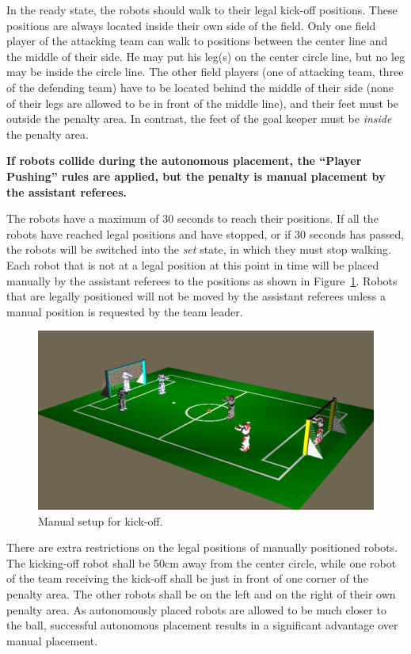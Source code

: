 \documentclass[12pt]{article}
\begin{document}
In the ready state, the robots should walk
to their legal kick-off positions. These positions are always
located inside their own side of the field. Only one field player
of the attacking team can walk to positions between the center line
and the middle of their side. He may put his leg(s) on the
center circle line, but no leg may be inside the circle line. The
other field players (one of attacking team, three of the defending team)
have to be located behind the middle of their side (none of their
legs are allowed to be in front of the middle line), and their feet must be outside the penalty area.
In contrast, the feet of the goal keeper must be \emph{inside}
the penalty area.

\textbf{If robots collide during the autonomous placement, the ``Player Pushing'' rules are applied, but
the penalty is manual placement by the assistant referees.}

The robots have a maximum of 30 seconds to reach their positions.
If all the robots have reached legal positions and have stopped, or
if 30 seconds has passed, the robots will be switched into the
\emph{set} state, in which they
must stop walking. Each robot that is not at a legal position at
this point in time will be placed manually by the assistant referees
to the positions as shown in Figure~\ref{fig:ko}. Robots
that are legally positioned will not be moved by the assistant
referees unless a manual position is requested by the team leader.

\begin{figure}[t]
\centerline{\includegraphics[width=\columnwidth]{figs/Kickoff3vs3}}
\caption{Manual setup for kick-off.}
\label{fig:ko}
\end{figure}

There are extra restrictions on the legal positions of manually
positioned robots. The kicking-off robot shall be 50cm
away from the center circle, while one robot of the team receiving the kick-off shall
be just in front of one corner of the penalty area. The other robots
shall be on the left and on the right of their own penalty area. As
autonomously placed robots are allowed to be much closer to the
ball, successful autonomous placement results in a significant
advantage over manual placement.
\end{document}
